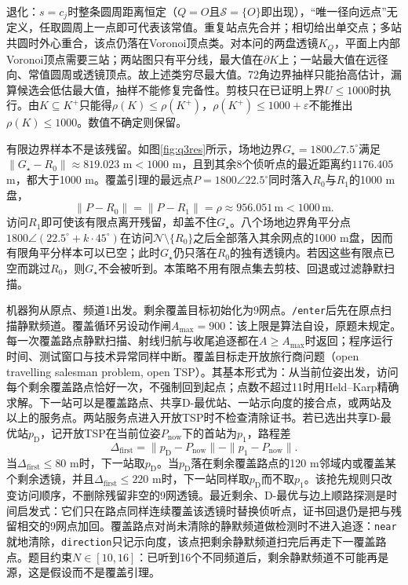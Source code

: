 \documentclass{cumcmthesis}
\begin{document}
退化：$s=c_j$时整条圆周距离恒定（$Q=O$且$\mathcal{S}=\{O\}$即出现），“唯一径向远点”无定义，任取圆周上一点即可代表该常值。重复站点先合并；相切给出单交点；多站共圆时外心重合，该点仍落在Voronoi顶点类。对本问的两盘透镜$K_Q$，平面上内部Voronoi顶点需要三站；两站图只有平分线，最大值在$\partial K$上；一站最大值在远径向、常值圆周或透镜顶点。故上述类穷尽最大值。72角边界抽样只能抬高估计，漏算候选会低估最大值，抽样不能修复完备性。剪枝只在已证明上界$U\le 1000$时执行。由$K\subseteq K^+$只能得$\rho(K)\le\rho(K^+)$，$\rho(K^+)\le 1000+\varepsilon$不能推出$\rho(K)\le 1000$。数值不确定则保留。

有限边界样本不是该残留。如图\ref{fig:q3res}所示，场地边界$G_\star=1800\angle 7.5^\circ$满足$\|G_\star-R_0\|\approx 819.023$ m$<1000$ m，且到其余8个侦听点的最近距离约$1176.405$ m，都大于1000 m。覆盖引理的最远点$P=1800\angle 22.5^\circ$同时落入$R_0$与$R_1$的1000 m盘，
\[
\|P-R_0\|=\|P-R_1\|=\rho\approx 956.051\,\mathrm{m}<1000\,\mathrm{m}.
\]
访问$R_1$即可使该有限点离开残留，却盖不住$G_\star$。八个场地边界角平分点$1800\angle(22.5^\circ+k\cdot 45^\circ)$在访问$\mathcal{N}\setminus\{R_0\}$之后全部落入其余网点的1000 m盘，因而有限角平分样本可以已空；此时$G_\star$仍只落在$R_0$的独有透镜内。若因这些有限点已空而跳过$R_0$，则$G_\star$不会被听到。本策略不用有限点集去剪枝、回退或过滤静默扫描。

机器狗从原点、频道1出发。剩余覆盖目标初始化为9网点。\texttt{/enter}后先在原点扫描静默频道。覆盖循环另设动作闸$A_{\max}=900$：该上限是算法自设，原题未规定。每一次覆盖路点静默扫描、射线归航与收尾追逐都在$A\ge A_{\max}$时返回；程序运行时间、测试窗口与技术异常同样中断。覆盖目标走开放旅行商问题（open travelling salesman problem, open TSP）。其基本形式为：从当前位姿出发，访问每个剩余覆盖路点恰好一次，不强制回到起点；点数不超过11时用Held--Karp精确求解。下一站可以是覆盖路点、共享D-最优站、一站示向度的接合点，或两站及以上的服务点。两站服务点进入开放TSP时不检查清除证书。若已选出共享D-最优站$p_{\mathrm{D}}$，记开放TSP在当前位姿$P_{\mathrm{now}}$下的首站为$p_1$，路程差
\begin{equation}
\Delta_{\mathrm{first}}=\|p_{\mathrm{D}}-P_{\mathrm{now}}\|-\|p_1-P_{\mathrm{now}}\|.
\label{eq:dfirst}
\end{equation}
当$\Delta_{\mathrm{first}}\le 80$ m时，下一站取$p_{\mathrm{D}}$。当$p_{\mathrm{D}}$落在剩余覆盖路点的120 m邻域内或覆盖某个剩余透镜，并且$\Delta_{\mathrm{first}}\le 220$ m时，下一站同样取$p_{\mathrm{D}}$而不取$p_1$。该抢先规则只改变访问顺序，不删除残留非空的9网透镜。最近剩余、D-最优与边上顺路探测是时间启发式：它们只在路点同样连续覆盖该透镜时替换侦听点，证书回退仍是把与残留相交的9网点加回。覆盖路点对尚未清除的静默频道做检测时不进入追逐：\texttt{near}就地清除，\texttt{direction}只记示向度，该点把剩余静默频道扫完后再走下一覆盖路点。题目约束$N\in[10,16]$：已听到16个不同频道后，剩余静默频道不可能再是源，这是假设而不是覆盖引理。
\end{document}
